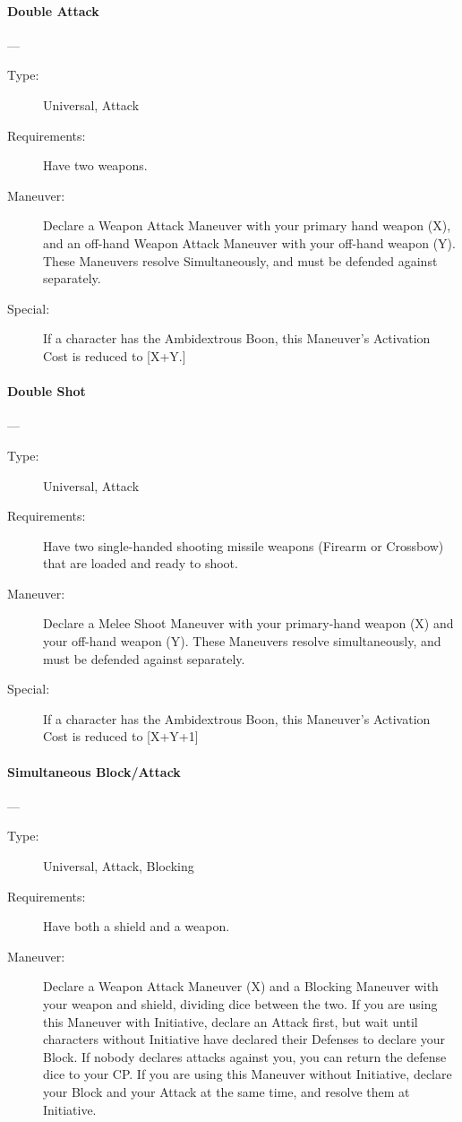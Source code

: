 \documentclass[oneside,11pt,english]{book}
\begin{document}
\paragraph{\large\label{man:Double Attack}Double Attack}---\quad{\large[X+Y+1]}
\vspace{-10pt}\begin{description} 
\item [Type:] Universal, Attack
\item [Requirements:] Have two weapons.
\item [Maneuver:] Declare a Weapon Attack Maneuver with your primary hand weapon (X), and an off-hand 
Weapon Attack Maneuver with your off-hand weapon (Y). These Maneuvers resolve Simultaneously, and must be defended against separately. 
\item [Special:] If a character has the Ambidextrous Boon, this Maneuver’s Activation Cost is reduced to [X+Y.] 
\end{description}

\paragraph{\large\label{man:Double Shot}Double Shot}---\quad{\large[X+Y+2]}
\vspace{-10pt}\begin{description} 
\item [Type:] Universal, Attack 
\item [Requirements:] Have two single-handed shooting missile weapons (Firearm or Crossbow) that are loaded 
and ready to shoot. 
\item [Maneuver:] Declare a Melee Shoot Maneuver with your primary-hand weapon (X) and your off-hand 
weapon (Y). These Maneuvers resolve simultaneously, and must be defended against separately. 
\item [Special:] If a character has the Ambidextrous Boon, this Maneuver’s Activation Cost is reduced to 
[X+Y+1] 
\end{description}
\paragraph{\large\label{man:Simultaneous Block/Attack}Simultaneous Block/Attack}---\quad{\large[X+Y]}
\vspace{-10pt}\begin{description} 
\item [Type:] Universal, Attack, Blocking 
\item [Requirements:] Have both a shield and a weapon. 
\item [Maneuver:] Declare a Weapon Attack Maneuver (X) and a Blocking Maneuver with your weapon and 
shield, dividing dice between the two. 
If you are using this Maneuver with Initiative, declare an Attack first, but wait until characters without 
Initiative have declared their Defenses to declare your Block. If nobody declares attacks against you, you 
can return the defense dice to your CP. 
If you are using this Maneuver without Initiative, declare your Block and your Attack at the same time, 
and resolve them at Initiative. 
\end{description}
\end{document}
